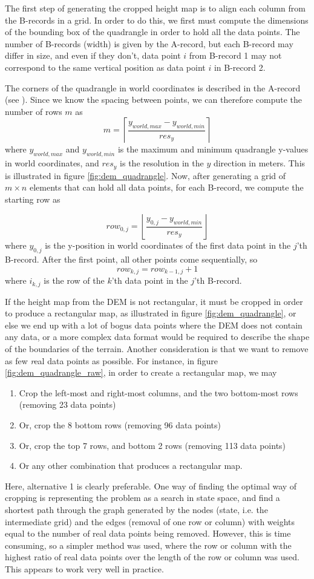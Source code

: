 The first step of generating the cropped height map is to align each column from the B-records in a grid. In order to do this, we first must compute the dimensions of the bounding box of the quadrangle in order to hold all the data points. The number of B-records (width) is given by the A-record, but each B-record may differ in size, and even if they don't, data point $i$ from B-record 1 may not correspond to the same vertical position as data point $i$ in B-record 2. 

The corners of the quadrangle in world coordinates is described in the A-record (see \cite{usgsdem}). Since we know the spacing between points, we can therefore compute the number of rows $m$ as
$$
m = \left\lceil\frac{y_{world,max}-y_{world,min}}{res_y}\right\rceil
$$
where $y_{world,max}$ and $y_{world,min}$ is the maximum and minimum quadrangle y-values in world coordinates, and $res_y$ is the resolution in the $y$ direction in meters. This is illustrated in figure \ref{fig:dem_quadrangle}. Now, after generating a grid of $m\times n$ elements that can hold all data points, for each B-record, we compute the starting row as

$$
row_{0,j} = \left\lfloor \frac{y_{0,j}-y_{world,min}}{res_y}\right\rfloor
$$
where $y_{0,j}$ is the y-position in world coordinates of the first data point in the $j$'th B-record. After the first point, all other points come sequentially, so
$$
row_{k,j} = row_{k-1,j} + 1
$$
where $i_{k,j}$ is the row of the $k$'th data point in the $j$'th B-record. 

If the height map from the DEM is not rectangular, it must be cropped in order to produce a rectangular map, as illustrated in figure \ref{fig:dem_quadrangle}, or else we end up with a lot of bogus data points where the DEM does not contain any data, or a more complex data format would be required to describe the shape of the boundaries of the terrain. Another consideration is that we want to remove as few {\textit real} data points as possible. For instance, in figure \ref{fig:dem_quadrangle_raw}, in order to create a rectangular map, we may
\begin{enumerate}
\item Crop the left-most and right-most columns, and the two bottom-most rows (removing 23 data points)
\item Or, crop the 8 bottom rows (removing 96 data points)
\item Or, crop the top 7 rows, and bottom 2 rows (removing 113 data points)
\item Or any other combination that produces a rectangular map.
\end{enumerate}
Here, alternative 1 is clearly preferable. One way of finding the optimal way of cropping is representing the problem as a search in state space, and find a shortest path through the graph generated by the nodes (state, i.e. the intermediate grid) and the edges (removal of one row or column) with weights equal to the number of real data points being removed. However, this is time consuming, so a simpler method was used, where the row or column with the highest ratio of real data points over the length of the row or column was used. This appears to work very well in practice.

